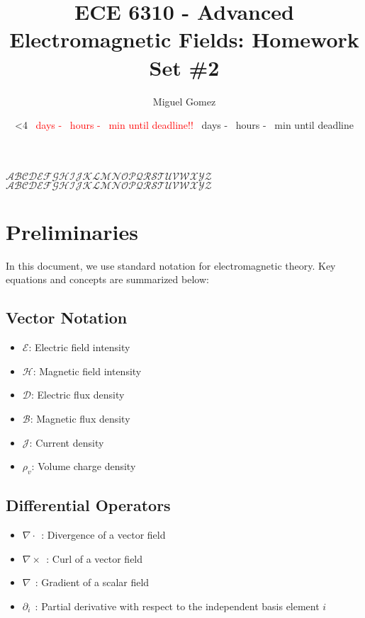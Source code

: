 \documentclass[12pt]{article}
\newcommand{\TimeUntilDue}{
  \ifnum\daystilldue<4
    \textcolor{red}{
    \number\daystilldue\ days - 
    \number\hourstilldue\ hours - 
    \number\minutestilldue\ min until deadline!!
  }
\else
    \number\daystilldue\ days - 
    \number\hourstilldue\ hours - 
    \number\minutestilldue\ min until deadline
  \fi
}
\begin{document}
\newcommand{\Cross}[2]{
\hat a_x(#1_2#2_3 -#1_3#2_2) -\hat a_y(#1_1#2_3-#1_3#2_1) + \hat a_z(#1_1#2_2-#1_2#2_1) 
}
\title{ECE 6310 - Advanced Electromagnetic Fields: Homework Set \#2}
\author{Miguel Gomez}
\date{\TimeUntilDue}
\maketitle

\begin{center}
  $\mathcal{ABCDEFGHIJKLMNOPQRSTUVWXYZ}$\\
$\mathscr{ABCDEFGHIJKLMNOPQRSTUVWXYZ}$
\end{center}
\section{Preliminaries}

In this document, we use standard notation for electromagnetic theory. Key equations and concepts are summarized below:

\subsection*{Vector Notation}
\begin{itemize}
  \item $\bm{\mathcal{E}}$: Electric field intensity
  \item $\bm{\mathcal{H}}$: Magnetic field intensity
  \item $\bm{\mathcal{D}}$: Electric flux density
  \item $\bm{\mathcal{B}}$: Magnetic flux density
  \item $\bm{\mathcal{J}}$: Current density
  \item $\rho_v$: Volume charge density
\end{itemize}

\subsection*{Differential Operators}
\begin{itemize}
  \item $\nabla \cdot\ \ $: Divergence of a vector field
  \item $\nabla \times\ \ $: Curl of a vector field
  \item $\nabla\ \ $: Gradient of a scalar field
  \item $\partial_i\ \ $: Partial derivative with respect to the independent basis element $i$
\end{itemize}
\end{document}
